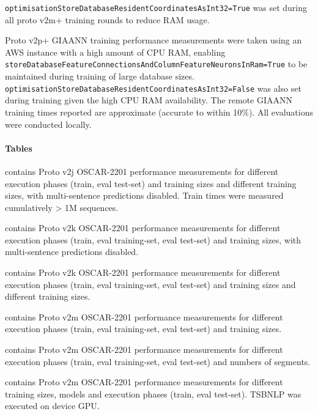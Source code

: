 \texttt{optimisationStoreDatabaseResidentCoordinatesAsInt32=True} was set during all proto v2m+ training rounds to reduce RAM usage. 

Proto v2p+ GIAANN training performance measurements were taken using an AWS instance with a high amount of CPU RAM, enabling \texttt{storeDatabaseFeatureConnectionsAndColumnFeatureNeuronsInRam=True} to be maintained during training of large database sizes. \texttt{optimisationStoreDatabaseResidentCoordinatesAsInt32=False} was also set during training given the high CPU RAM availability. The remote GIAANN training times reported are approximate (accurate to within 10\%). All evaluations were conducted locally.

\paragraph{Tables}

 contains Proto v2j OSCAR-2201 performance measurements for different execution phases (train, eval test-set) and training sizes and different training sizes, with multi-sentence predictions disabled. Train times were measured cumulatively > 1M sequences.

 contains Proto v2k OSCAR-2201 performance measurements for different execution phases (train, eval training-set, eval test-set) and training sizes, with multi-sentence predictions disabled.

 contains Proto v2k OSCAR-2201 performance measurements for different execution phases (train, eval training-set, eval test-set) and training sizes and different training sizes.

 contains Proto v2m OSCAR-2201 performance measurements for different execution phases (train, eval training-set, eval test-set) and training sizes.

 contains Proto v2m OSCAR-2201 performance measurements for different execution phases (train, eval training-set, eval test-set) and numbers of segments.

 contains Proto v2m OSCAR-2201 performance measurements for different training sizes, models and execution phases (train, eval test-set). TSBNLP was executed on device GPU.

